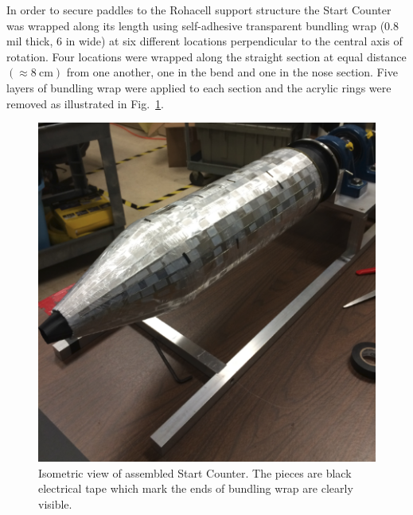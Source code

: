 In order to secure paddles to the Rohacell support structure the Start Counter was wrapped along its length using self-adhesive transparent bundling wrap (0.8 mil thick, 6 in wide) at six different locations perpendicular to the central axis of rotation. Four locations were wrapped along the straight section at equal distance $(\approx 8\ \mathrm{cm})$ from one another, one in the bend and one in the nose section.  Five layers of bundling wrap were applied to each section and the acrylic rings were removed as illustrated in Fig.~\ref{fig:st_iso_eel}.
\begin{figure}[tbph]
	\centering
	\includegraphics[width=1.0\columnwidth]{fabrication/figs/st_iso_eel}
	\caption[Isometric view of assembled Start Counter]{Isometric view of assembled Start Counter. The pieces are black electrical tape which mark the ends of bundling wrap are clearly visible.}
	\label{fig:st_iso_eel}
\end{figure}


